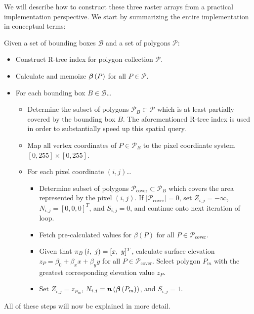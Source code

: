 We will describe how to construct these three raster arrays from a practical implementation perspective.
We start by summarizing the entire implementation in conceptual terms:
\begin{leftbar}
  \noindent
  Given a set of bounding boxes $\mathcal{B}$ and a set of polygons $\mathcal{P}$:
  \begin{itemize}[leftmargin=*]
    \item Construct R-tree index for polygon collection $\mathcal{P}$.
    \item Calculate and memoize $\boldsymbol{\beta}\left(P\right)$ for all $P \in \mathcal{P}$.
    \item For each bounding box $B \in \mathcal{B}$\ldots
    \begin{itemize}[nosep,leftmargin=0.5cm]
      \item Determine the subset of polygons $\mathcal{P}_B \subset \mathcal{P}$ which is at least partially covered by the bounding box $B$.
        The aforementioned R-tree index is used in order to substantially speed up this spatial query.
      \item Map all vertex coordinates of $P \in \mathcal{P}_B$ to the pixel coordinate system $\left[0, 255\right] \times \left[0, 255\right]$.
      \item For each pixel coordinate $(i, j)$\ldots
      \begin{itemize}[nosep,leftmargin=0.5cm]
        \item Determine subset of polygons $\mathcal{P}_{\mathrm{cover}} \subset \mathcal{P}_B$ which covers the area represented by the pixel $(i, j)$.
          If $|\mathcal{P}_{\mathrm{cover}}| = 0$, set $Z_{i,j} = -\infty$, $N_{i, j} = {[0, 0, 0]}^T$, and $S_{i, j} = 0$, and continue onto next iteration of loop.
        \item Fetch pre-calculated values for $\beta(P)$ for all $P \in \mathcal{P}_{\mathrm{cover}}$.
        \item Given that $\pi_{B}\left(i,~j\right) = [x,~y]^T$, calculate surface elevation $z_P = \beta_0 + \beta_x x + \beta_y y$ for all $P \in \mathcal{P}_{\mathrm{cover}}$.
          Select polygon $P_m$ with the greatest corresponding elevation value $z_P$.
        \item Set $Z_{i,j} = z_{P_m}$, $N_{i, j} = \boldsymbol{n}\left(\boldsymbol{\beta}\left(P_m\right)\right)$, and $S_{i, j} = 1$.
      \end{itemize}
    \end{itemize}
  \end{itemize}
\end{leftbar}
\noindent
All of these steps will now be explained in more detail.

